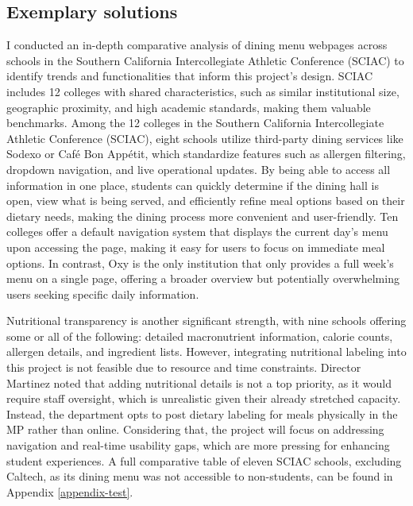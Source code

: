 \documentclass[10pt,twocolumn]{article}
\begin{document}
\subsection{ Exemplary solutions}

I conducted an in-depth comparative analysis of dining menu webpages across schools in the Southern California Intercollegiate Athletic Conference (SCIAC) to identify trends and functionalities that inform this project’s design. SCIAC includes 12 colleges with shared characteristics, such as similar institutional size, geographic proximity, and high academic standards, making them valuable benchmarks. Among the 12 colleges in the Southern California Intercollegiate Athletic Conference (SCIAC), eight schools utilize third-party dining services like Sodexo or Café Bon Appétit, which standardize features such as allergen filtering, dropdown navigation, and live operational updates. By being able to access all information in one place, students can quickly determine if the dining hall is open, view what is being served, and efficiently refine meal options based on their dietary needs, making the dining process more convenient and user-friendly. Ten colleges offer a default navigation system that displays the current day’s menu upon accessing the page, making it easy for users to focus on immediate meal options. In contrast, Oxy is the only institution that only provides a full week’s menu on a single page, offering a broader overview but potentially overwhelming users seeking specific daily information.

Nutritional transparency is another significant strength, with nine schools offering some or all of the following: detailed macronutrient information, calorie counts, allergen details, and ingredient lists. However, integrating nutritional labeling into this project is not feasible due to resource and time constraints. Director Martinez noted that adding nutritional details is not a top priority, as it would require staff oversight, which is unrealistic given their already stretched capacity. Instead, the department opts to post dietary labeling for meals physically in the MP rather than online. Considering that, the project will focus on addressing navigation and real-time usability gaps, which are more pressing for enhancing student experiences. A full comparative table of eleven SCIAC schools, excluding Caltech, as its dining menu was not accessible to non-students, can be found in Appendix \ref{appendix-test}.
\end{document}
